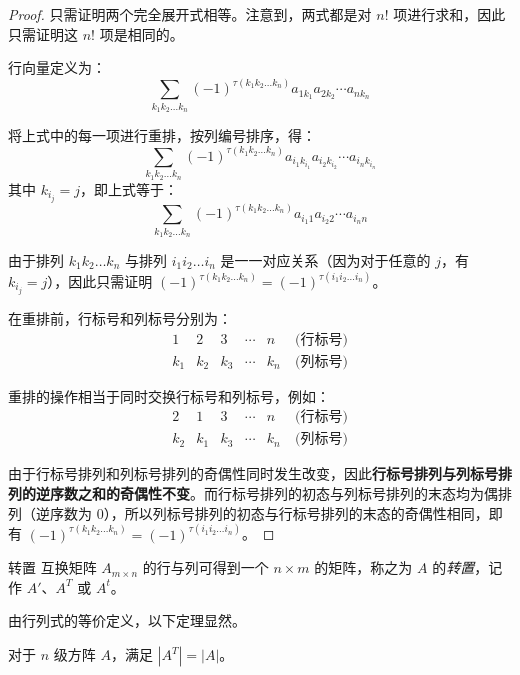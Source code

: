 \begin{proof}
	只需证明两个完全展开式相等。注意到，两式都是对 $n!$ 项进行求和，因此只需证明这 $n!$ 项是相同的。

	行向量定义为：
	$$
	\sum_{k_1 k_2 \ldots k_n} (-1)^{\tau(k_1 k_2 \ldots k_n)} a_{1k_1} a_{2k_2} \cdots a_{nk_n}
	$$

	将上式中的每一项进行重排，按列编号排序，得：
	$$
	\sum_{k_1 k_2 \ldots k_n} (-1)^{\tau(k_1 k_2 \ldots k_n)} a_{i_1 k_{i_1}} a_{i_2 k_{i_2}} \cdots a_{i_n k_{i_n}}
	$$
	其中 $k_{i_j} = j$，即上式等于：
	$$
	\sum_{k_1 k_2 \ldots k_n} (-1)^{\tau(k_1 k_2 \ldots k_n)} a_{i_1 1} a_{i_2 2} \cdots a_{i_n n}
	$$

	由于排列 $k_1 k_2 \ldots k_n$ 与排列 $i_1 i_2 \ldots i_n$ 是一一对应关系（因为对于任意的 $j$，有 $k_{i_j} = j$），因此只需证明 $(-1)^{\tau(k_1 k_2 \ldots k_n)} = (-1)^{\tau(i_1 i_2 \ldots i_n)}$。

	\bigskip

	在重排前，行标号和列标号分别为：
	$$
	\begin{matrix}
		1 & 2 & 3 & \cdots & n & \pod{\text{行标号}}
		\\
		k_1 & k_2 & k_3 & \cdots & k_n & \pod{\text{列标号}}
	\end{matrix}
	$$

	重排的操作相当于同时交换行标号和列标号，例如：
	$$
	\begin{matrix}
		2 & 1 & 3 & \cdots & n & \pod{\text{行标号}}
		\\
		k_2 & k_1 & k_3 & \cdots & k_n & \pod{\text{列标号}}
	\end{matrix}
	$$

	由于行标号排列和列标号排列的奇偶性同时发生改变，因此\textbf{行标号排列与列标号排列的逆序数之和的奇偶性不变}。而行标号排列的初态与列标号排列的末态均为偶排列（逆序数为 $0$），所以列标号排列的初态与行标号排列的末态的奇偶性相同，即有 $(-1)^{\tau(k_1 k_2 \ldots k_n)} = (-1)^{\tau(i_1 i_2 \ldots i_n)}$。
\end{proof}

\begin{definition}{转置}
	互换矩阵 $A_{m \times n}$ 的行与列可得到一个 $n \times m$ 的矩阵，称之为 $A$ 的\emph{转置}，记作 $A'$、$A^T$ 或 $A^t$。
\end{definition}

由行列式的等价定义，以下定理显然。

\begin{theorem}
	对于 $n$ 级方阵 $A$，满足 $|A^T| = |A|$。
\end{theorem}

